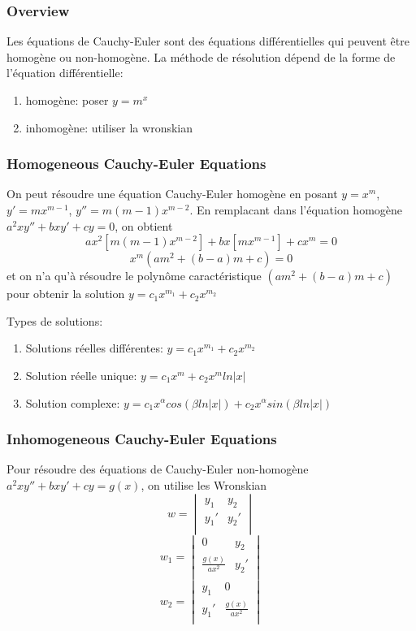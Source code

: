 \documentclass{article}
\begin{document}
\subsubsection{Overview}%
\label{ssub:Overview}

Les équations de Cauchy-Euler sont des équations différentielles qui
peuvent être homogène ou non-homogène. La méthode de résolution dépend
de la forme de l'équation différentielle:
\begin{enumerate}
    \item homogène: poser $y=m^x$
    \item inhomogène: utiliser la wronskian
\end{enumerate}

\subsubsection{Homogeneous Cauchy-Euler Equations}%
\label{ssub:Cauchy-Euler Equations}

On peut résoudre une équation Cauchy-Euler homogène en posant $y=x^m$,
$y'=m x^{m-1}$, $y''=m (m-1) x^{m-2}$. En remplacant dans l'équation
homogène $a^2xy''+bxy'+cy=0$, on obtient
$$ax^2 [m(m-1)x^{m-2}]+bx[mx^{m-1}]+cx^m=0$$
$$x^m (am^2+(b-a)m+c)=0$$
et on n'a qu'à résoudre le polynôme caractéristique $ (am^2+(b-a)m+c)$
pour obtenir la solution $y=c_1 x^{m_1}+c_2 x^{m_2}$

Types de solutions:
\begin{enumerate}
    \item Solutions réelles différentes: $y=c_1 x^{m_1}+c_2 x^{m_2}$
    \item Solution réelle unique: $y = c_1 x^m + c_2 x^m ln|x|$
    \item Solution complexe: $y= c_1 x^\alpha cos(\beta ln|x|)
	+ c_2 x^\alpha sin(\beta ln|x|)$
\end{enumerate}

\subsubsection{Inhomogeneous Cauchy-Euler Equations}%
\label{ssub:Cauchy-Euler Equations}

Pour résoudre des équations de Cauchy-Euler non-homogène
$a^2xy''+bxy'+cy=g(x)$, on utilise les Wronskian
$$ w = \begin{vmatrix}
    y_1 & y_2\\
    y_1' & y_2'\\
\end{vmatrix}$$
$$ w_1 = \begin{vmatrix}
    0 & y_2\\
    \frac{g(x)}{ax^2}  & y_2'\\
\end{vmatrix}$$
$$ w_2 = \begin{vmatrix}
    y_1 & 0\\
    y_1' & \frac{g(x)}{ax^2} \\
\end{vmatrix}$$
\end{document}
